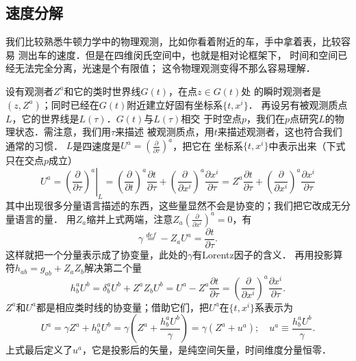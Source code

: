 \subsection{速度分解}

我们比较熟悉牛顿力学中的物理观测，比如你看着附近的车，手中拿着表，比较容易
测出车的速度．但是在四维闵氏空间中，也就是相对论框架下，
时间和空间已经无法完全分离，光速是个有限值；
这令物理观测变得不那么容易理解．

设有观测者$Z^a$和它的类时世界线$G(t)$，在点$z\in G(t)$处
的瞬时观测者是$(z,Z^a)$；同时已经在$G(t)$附近建立好固有坐标系$\{t,x^i\}$．
再设另有被观测质点$L$，它的世界线是$L(\tau)$．$G(t)$与$L(\tau)$相交
于时空点$p$，我们在$p$点研究$L$的物理状态．需注意，我们用$\tau$来描述
被观测质点，用$t$来描述观测者，这也符合我们通常的习惯．
$L$是四速度是$U^a=(\frac{\partial}{\partial \tau})^a$，把它在
坐标系$\{t,x^i\}$中表示出来（下式只在交点$p$成立）
\begin{equation}
    U^a=\left.\left(\frac{\partial}{\partial \tau}\right)^a\right|_{L}
    =\left(\frac{\partial}{\partial t}\right)^a \frac{\partial t}{\partial \tau}
    +\left(\frac{\partial}{\partial x^i}\right)^a \frac{\partial x^i}{\partial \tau}
    =Z^a \frac{\partial t}{\partial \tau}
    +\left(\frac{\partial}{\partial x^i}\right)^a \frac{\partial x^i}{\partial \tau} 
\end{equation}
其中出现很多分量语言描述的东西，这些量显然不会是协变的；我们把它改成无分量语言的量．
用$Z_a$缩并上式两端，注意$Z_a (\frac{\partial}{\partial x^i})^a =0$，有
\begin{equation}
    \gamma \overset{def}{=} -Z_a U^a = \frac{\partial t}{\partial \tau}.
\end{equation}
这样就把一个分量表示成了协变量，此处的$\gamma$有Lorentz因子的含义．
再用投影算符$h_{ab}=g_{ab}+Z_a Z_b$解决第二个量
\begin{equation}
    h_{b}^a U^b = \delta^a_b U^b + Z^a Z_b U^b
    = U^a - Z^a\frac{\partial t}{\partial \tau}
    = \left(\frac{\partial}{\partial x^i}\right)^a \frac{\partial x^i}{\partial \tau}.
\end{equation}
$Z^a$和$U^a$都是相应类时线的协变量；借助它们，把$U^a$在$\{t,x^i\}$系表示为
\begin{equation}\label{chfd:eqn_UZu}
    U^a = \gamma Z^a + h_{b}^a U^b = \gamma \left(Z^a + \frac{h_{b}^a U^b}{\gamma} \right)
    =\gamma \left(Z^a + u^a \right);\quad u^a\equiv \frac{h_{b}^a U^b}{\gamma}.
\end{equation}
上式最后定义了$u^a$，它是投影后的矢量，是纯空间矢量，时间维度分量恒零．

